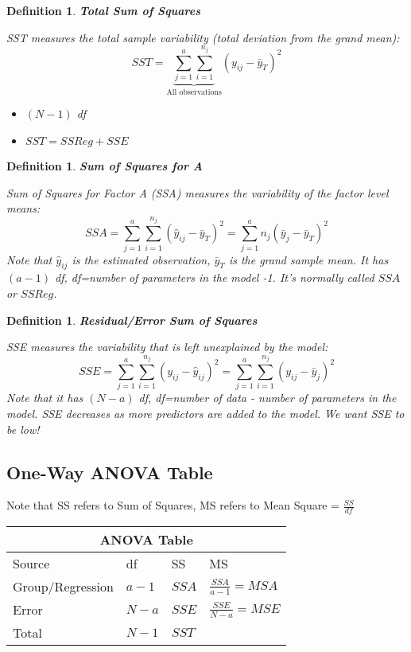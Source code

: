 \documentclass[a4paper,11pt]{article}
\newtheorem{defn}[thm]{Definition}
\begin{document}
\begin{defn}
\normalfont
\textbf{Total Sum of Squares}

SST measures the {total sample variability} (total deviation from the grand mean):
$$SST=\underbrace{\sum_{j=1}^a\sum_{i=1}^{n_j}}_{\text{All observations}}(y_{ij}-\bar{y}_T)^2$$
\begin{itemize}
\item $(N-1)$ df
\item $SST=SSReg+SSE$
\end{itemize}

\end{defn}

\begin{defn}
\normalfont
\textbf{Sum of Squares for A}

Sum of Squares for Factor A (SSA) measures the variability of the factor level means: 
$$SSA=\sum_{j=1}^a\sum_{i=1}^{n_j}(\hat{y}_{ij}-\bar{y}_T)^2=\sum_{j=1}^an_j(\bar{y}_j-\bar{y}_T)^2$$
Note that $\hat{y}_{ij}$ is the estimated observation, $\bar{y}_T$ is the grand sample mean. It has $(a-1)$ df, df=number of parameters in the model -1. It's normally called $SSA$ or $SSReg$. 

\end{defn}

\begin{defn}
\normalfont
\textbf{Residual/Error Sum of Squares}

SSE measures the variability that is left unexplained by the model: 
$$SSE=\sum_{j=1}^a\sum_{i=1}^{n_j}(y_{ij}-\hat{y}_{ij})^2=\sum_{j=1}^a\sum_{i=1}^{n_j}(y_{ij}-\bar{y}_j)^2$$
Note that it has $(N-a)$ df, df=number of data - number of parameters in the model. SSE decreases as more predictors are added to the model. We want SSE to be low! 
\end{defn}

\subsection{One-Way ANOVA Table}
Note that SS refers to Sum of Squares, MS refers to Mean Square = $\frac{SS}{df}$
\begin{center}
\begin{tabular}{ |p{3cm}||p{3cm}|p{3cm}|p{3cm}|  }
 \hline
 \multicolumn{4}{|c|}{ANOVA Table} \\
 \hline
 Source & df &SS&MS\\
 \hline
 Group/Regression   & $a-1$    &$SSA$&   $\frac{SSA}{a-1}=MSA$\\
 Error &   $N-a$  & $SSE$   & $\frac{SSE}{N-a}=MSE$\\
 \hline
 Total &$N-1$ & $SST$ &  \\
 \hline
\end{tabular}
\end{center}
\vspace{18pt}
\end{document}
